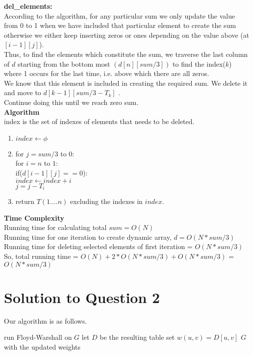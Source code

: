 \documentclass[11pt]{article}
\begin{document}
\textbf{del\_elements:} \\
According to the algorithm, for any particular sum we only update the value from 0 to 1 when we have included that particular element
to create the sum otherwise we either keep inserting zeros or ones depending on the value above (at $[i-1][j]$).\\
Thus, to find the elements which constitute the sum, we traverse the last column of $d$ starting from the bottom most $(d[n][sum/3])$
to find the index($k$) where 1 occurs for the last time, i.e. above which there are all zeros. \\
We know that this element is included in creating the required sum. We delete it and move to $d[k-1][sum/3 - T_k]$ .\\
Continue doing this until we reach zero sum. \\
\textbf{Algorithm} \\
index is the set of indexes of elements that needs to be deleted. \\
\begin{enumerate}
	\item $index \leftarrow \phi$
	\item for $j = sum/3$ to $0$: \\
	\indent for $i = n$ to $1$: \\
	\indent 	if($d[i-1][j] == 0$): \\
	\indent 		$index \leftarrow index + i$ \\
	\indent 		$j = j - T_i$
	\item return $T(1....n)$ excluding the indexes in $index$.
\end{enumerate}

\textbf{Time Complexity} \\
Running time for calculating total $sum = O(N)$ \\
Running time for one iteration to create dynamic array, $d = O(N*sum/3)$ \\
Running time for deleting selected elements of first iteration = $O(N*sum/3)$ \\
So, total running time = $O(N) + 2*O(N*sum/3) + O(N*sum/3)$ = $O(N*sum/3)$

\section{Solution to Question 2}

Our algorithm is as follows.

\begin{algorithm}
  \begin{algorithmic}
      \State run Floyd-Warshall on $G$
      \State let $D$ be the resulting table
          \State set $w(u, v) = D[u, v]$
        \EndIf
      \EndFor
      \State \Return $G$ with the updated weights
    \EndFunction
  \end{algorithmic}
\end{algorithm}
\end{document}
